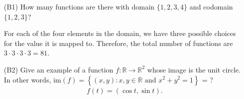 \documentclass{article}
\begin{document}
    \begin{itemize}

        \item [(B1)] How many functions are there with domain $\{ 1, 2, 3, 4 \}$ and codomain $\{ 1, 2, 3 \}$? \par
            \qquad For each of the four elements in the domain, we have three possible choices for the value it is mapped to. Therefore, the total number of functions are $3 \cdot 3 \cdot 3 \cdot 3 = 81$.

        \item [(B2)] Give an example of a function $f : \mathbb{R} \rightarrow \mathbb{R}^2$ whose image is the unit circle.  In other words, $\mathrm{im}(f) = \left\{ (x,y) : x, y \in \mathbb{R} \text{ and } x^2 + y^2 = 1 \right\}$ = ?
            \begin{align*}
                f(t) = (\cos{t}, \sin{t}).
            \end{align*}
    \end{itemize}
\end{document}
